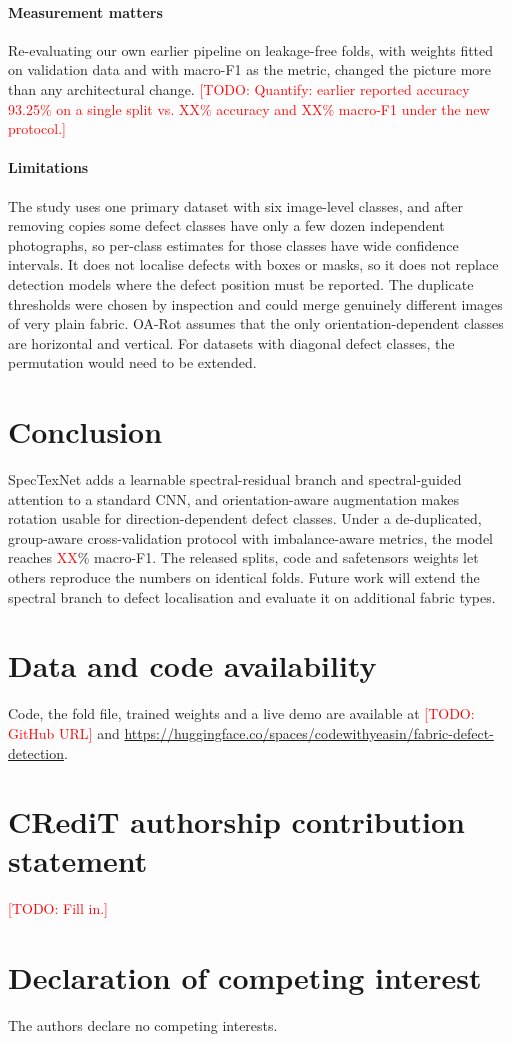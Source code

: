 \documentclass[preprint,12pt,authoryear]{elsarticle}
\newcommand{\todo}[1]{\textcolor{red}{[TODO: #1]}}
\providecommand{\PropMacroFone}{\textcolor{red}{XX}}
\providecommand{\VoneMacroFone}{\textcolor{red}{XX}}
\providecommand{\VoneAcc}{\textcolor{red}{XX}}
\begin{document}
\paragraph{Measurement matters}
Re-evaluating our own earlier pipeline on leakage-free folds, with weights fitted on validation data
and with macro-F1 as the metric, changed the picture more than any architectural change.
\todo{Quantify: earlier reported accuracy 93.25\% on a single split vs. \VoneAcc{}\% accuracy and
\VoneMacroFone{}\% macro-F1 under the new protocol.}

\paragraph{Limitations}
The study uses one primary dataset with six image-level classes, and after removing copies some
defect classes have only a few dozen independent photographs, so per-class estimates for those
classes have wide confidence intervals. It does not localise defects
with boxes or masks, so it does not replace detection models where the defect position must be
reported. The duplicate thresholds were chosen by inspection and could merge genuinely different
images of very plain fabric. OA-Rot assumes that the only orientation-dependent classes are
horizontal and vertical. For datasets with diagonal defect classes, the permutation would need to be
extended.

\section{Conclusion}
\label{sec:conclusion}
SpecTexNet adds a learnable spectral-residual branch and spectral-guided attention to a standard
CNN, and orientation-aware augmentation makes rotation usable for direction-dependent defect
classes. Under a de-duplicated, group-aware cross-validation protocol with imbalance-aware metrics,
the model reaches \PropMacroFone{}\% macro-F1. The released splits, code and safetensors weights let
others reproduce the numbers on identical folds. Future work will extend the spectral branch to
defect localisation and evaluate it on additional fabric types.

\section*{Data and code availability}
Code, the fold file, trained weights and a live demo are available at
\todo{GitHub URL} and \url{https://huggingface.co/spaces/codewithyeasin/fabric-defect-detection}.

\section*{CRediT authorship contribution statement}
\todo{Fill in.}

\section*{Declaration of competing interest}
The authors declare no competing interests.



\end{document}
